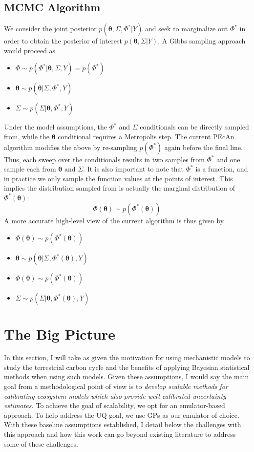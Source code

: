 \documentclass[12pt]{article}
\newcommand{\btheta}{\boldsymbol{\theta}}
\begin{document}
\subsection{MCMC Algorithm}
We consider the joint posterior $p(\btheta, \Sigma, \Phi^*|Y)$ and seek to marginalize out $\Phi^*$ in order to obtain the posterior of interest $p(\btheta, \Sigma|Y)$. A Gibbs sampling approach would proceed as 
\begin{itemize}
\item $\Phi \sim p(\Phi^*|\btheta, \Sigma, Y) = p(\Phi^*)$
\item $\btheta \sim p(\btheta|\Sigma, \Phi^*, Y)$
\item $\Sigma \sim p(\Sigma|\btheta, \Phi^*, Y)$
\end{itemize}
Under the model assumptions, the $\Phi^*$ and $\Sigma$ conditionals can be directly sampled from, while the $\btheta$ conditional requires a Metropolis step. The current PEcAn algorithm modifies the above by re-sampling 
$p(\Phi^*)$ again before the final line. Thus, each sweep over the conditionals results in two samples from $\Phi^*$ and one sample each from $\btheta$ and $\Sigma$. It is also important to note that 
$\Phi^*$ is a function, and in practice we only sample the function values at the points of interest. This implies the distribution sampled from is actually the marginal distribution of $\Phi^*(\btheta)$:
\[\Phi(\btheta) \sim p(\Phi^*(\btheta))\]
A more accurate high-level view of the current algorithm is thus given by 
\begin{itemize}
\item $\Phi(\btheta) \sim p(\Phi^*(\btheta))$
\item $\btheta \sim p(\btheta|\Sigma, \Phi^*(\btheta), Y)$
\item $\Phi(\btheta) \sim p(\Phi^*(\btheta))$
\item $\Sigma \sim p(\Sigma|\btheta, \Phi^*(\btheta), Y)$
\end{itemize}

\section{The Big Picture}
In this section, I will take as given the motivation for using mechanistic models to study the terrestrial carbon cycle and the benefits of applying Bayesian statistical methods when using such models. 
Given these assumptions, I would say the main goal from a methodological point of view is to \textit{develop scalable methods for calibrating ecosystem models which also provide well-calibrated
uncertainty estimates.} To achieve the goal of scalability, we opt for an emulator-based approach. To help address the UQ goal, we use GPs as our emulator of choice. With these baseline assumptions 
established, I detail below the challenges with this approach and how this work can go beyond existing literature to address some of these challenges. 
\end{document}

